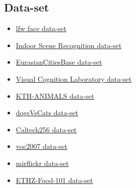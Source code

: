\documentclass[a4paper,12pt]{report}
\begin{document}
      \subsection{Data-set}
      \begin{itemize}
        \item \href{<http://vis-www.cs.umass.edu/lfw/>}{lfw face data-set}
        \item \href{<http://web.mit.edu/torralba/www/indoor.html>}{Indoor Scene Recognition data-set}
        \item \href{<https://graphics.cs.msu.ru/en/research/projects/msr/geometry>}{EurasianCitiesBase data-set}
        \item \href{<http://cvcl.mit.edu/database.htm>}{Visual Cognition Laboratory data-set}
        \item \href{<https://www.csc.kth.se/~heydarma/Datasets.html>}{KTH-ANIMALS data-set} 
        \item \href{<https://www.kaggle.com/c/dogs-vs-cats-redux-kernels-edition>}{dogsVsCats data-set}
        \item \href{<https://www.vision.caltech.edu/Image_Datasets/Caltech256/>}{Caltech256 data-set}
        \item \href{<http://host.robots.ox.ac.uk/pascal/VOC/voc2007/index.html>}{voc2007 data-set}
        \item \href{<http://press.liacs.nl/mirflickr/mirdownload.html>}{mirflickr data-set}
        \item \href{<https://www.vision.ee.ethz.ch/datasets_extra/food-101/>}{ETHZ-Food-101 data-set}
      \end{itemize}
          
\end{document}
